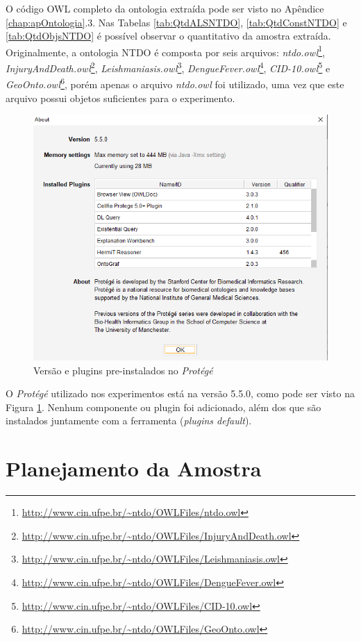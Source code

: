 \documentclass{bcc}
\begin{document}
O código OWL completo da ontologia extraída pode ser visto no Apêndice \ref{chap:apOntologia}.3. Nas Tabelas \ref{tab:QtdALSNTDO}, \ref{tab:QtdConstNTDO} e \ref{tab:QtdObjsNTDO} é possível observar o quantitativo da amostra extraída. Originalmente, a ontologia NTDO é composta por seis arquivos: \textit{ntdo.owl}\footnote{\url{http://www.cin.ufpe.br/~ntdo/OWLFiles/ntdo.owl}}, \textit{InjuryAndDeath.owl}\footnote{\url{http://www.cin.ufpe.br/~ntdo/OWLFiles/InjuryAndDeath.owl}}, \textit{Leishmaniasis.owl}\footnote{\url{http://www.cin.ufpe.br/~ntdo/OWLFiles/Leishmaniasis.owl}}, \textit{DengueFever.owl}\footnote{\url{http://www.cin.ufpe.br/~ntdo/OWLFiles/DengueFever.owl}}, \textit{CID-10.owl}\footnote{\url{http://www.cin.ufpe.br/~ntdo/OWLFiles/CID-10.owl}} e \textit{GeoOnto.owl}\footnote{\url{http://www.cin.ufpe.br/~ntdo/OWLFiles/GeoOnto.owl}}, porém apenas o arquivo \textit{ntdo.owl} foi utilizado, uma vez que este arquivo possui objetos suficientes para o experimento.

\begin{figure}[H]
\centering
\includegraphics[width=.5\textwidth]{Figuras/protege.png}
\caption{Versão e plugins pre-instalados no \textit{Protégé} } 
\label{fig:protege}
\end{figure}

O \textit{Protégé} utilizado nos experimentos está na versão 5.5.0, como pode ser visto na Figura \ref{fig:protege}. Nenhum componente ou plugin foi adicionado, além dos que são instalados juntamente com a ferramenta (\textit{plugins default}).

\section{Planejamento da Amostra}
\end{document}
